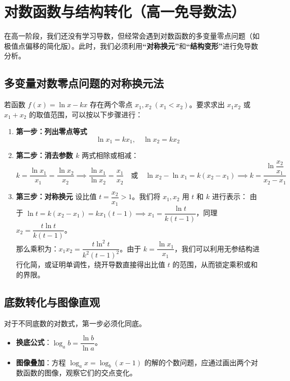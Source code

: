 \documentclass[11pt,a4paper]{ctexart}
\begin{document}
\newpage

\section{对数函数与结构转化（高一免导数法）}

在高一阶段，我们还没有学习导数，但经常会遇到对数函数的多变量零点问题（如极值点偏移的简化版）。此时，我们必须利用\textbf{“对称换元”}和\textbf{“结构变形”}进行免导数分析。

\subsection{多变量对数零点问题的对称换元法}
若函数 $f(x) = \ln x - kx$ 存在两个零点 $x_1, x_2\ (x_1 < x_2)$。要求求出 $x_1 x_2$ 或 $x_1+x_2$ 的取值范围，可以按以下步骤进行：
\begin{enumerate}
  \item \textbf{第一步：列出零点等式}
    \[ \ln x_1 = k x_1,\quad \ln x_2 = k x_2 \]
  \item \textbf{第二步：消去参数 $k$}
    两式相除或相减：
    \[ k = \frac{\ln x_1}{x_1} = \frac{\ln x_2}{x_2} \implies \frac{\ln x_1}{\ln x_2} = \frac{x_1}{x_2} \quad \text{或} \quad \ln x_2 - \ln x_1 = k(x_2 - x_1) \implies k = \frac{\ln\dfrac{x_2}{x_1}}{x_2 - x_1} \]
  \item \textbf{第三步：对称换元}
    设比值 $t = \dfrac{x_2}{x_1} > 1$。我们将 $x_1, x_2$ 用 $t$ 和 $k$ 进行表示：
    由于 $\ln t = k(x_2 - x_1) = k x_1(t - 1) \implies x_1 = \dfrac{\ln t}{k(t - 1)}$，同理 $x_2 = \dfrac{t \ln t}{k(t - 1)}$。\\
    那么乘积为：$x_1 x_2 = \dfrac{t \ln^2 t}{k^2(t-1)^2}$。由于 $k = \dfrac{\ln x_1}{x_1}$，我们可以利用无参结构进行化简，或证明单调性，绕开导数直接得出比值 $t$ 的范围，从而锁定乘积或和的界限。
\end{enumerate}

\subsection{底数转化与图像直观}
对于不同底数的对数式，第一步必须化同底。
\begin{itemize}
  \item \textbf{换底公式}：$\log_a b = \dfrac{\ln b}{\ln a}$。
  \item \textbf{图像叠加}：方程 $\log_a x = \log_b(x-1)$ 的解的个数问题，应通过画出两个对数函数的图像，观察它们的交点变化。
\end{itemize}
\end{document}
